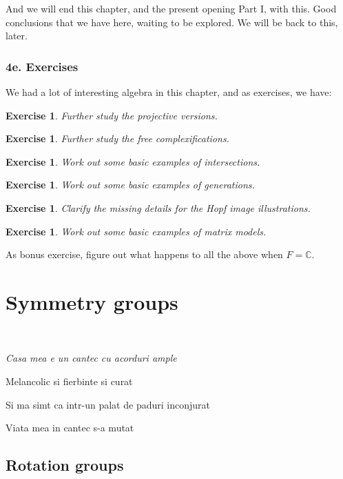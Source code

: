 \documentclass[12pt]{amsbook}
\newtheorem{exercise}[theorem]{Exercise}
\begin{document}
And we will end this chapter, and the present opening Part I, with this. Good conclusions that we have here, waiting to be explored. We will be back to this, later.

\section*{4e. Exercises}

We had a lot of interesting algebra in this chapter, and as exercises, we have:

\begin{exercise}
Further study the projective versions.
\end{exercise}

\begin{exercise}
Further study the free complexifications.
\end{exercise}

\begin{exercise}
Work out some basic examples of intersections.
\end{exercise}

\begin{exercise}
Work out some basic examples of generations.
\end{exercise}

\begin{exercise}
Clarify the missing details for the Hopf image illustrations.
\end{exercise}

\begin{exercise}
Work out some basic examples of matrix models.
\end{exercise}

As bonus exercise, figure out what happens to all the above when $F=\mathbb C$.

\part{Symmetry groups}

\ \vskip50mm

\begin{center}
{\em Casa mea e un cantec cu acorduri ample

Melancolic si fierbinte si curat

Si ma simt ca intr-un palat de paduri inconjurat

Viata mea in cantec s-a mutat}
\end{center}

\chapter{Rotation groups}
\end{document}
